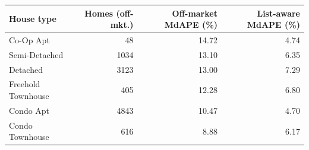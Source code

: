 \begin{tabular}{lrrr}
\toprule
House type & Homes (off-mkt.) & Off-market MdAPE (\%) & List-aware MdAPE (\%) \\
\midrule
Co-Op Apt & 48 & 14.72 & 4.74 \\
Semi-Detached & 1034 & 13.10 & 6.35 \\
Detached & 3123 & 13.00 & 7.29 \\
Freehold Townhouse & 405 & 12.28 & 6.80 \\
Condo Apt & 4843 & 10.47 & 4.70 \\
Condo Townhouse & 616 & 8.88 & 6.17 \\
\bottomrule
\end{tabular}
